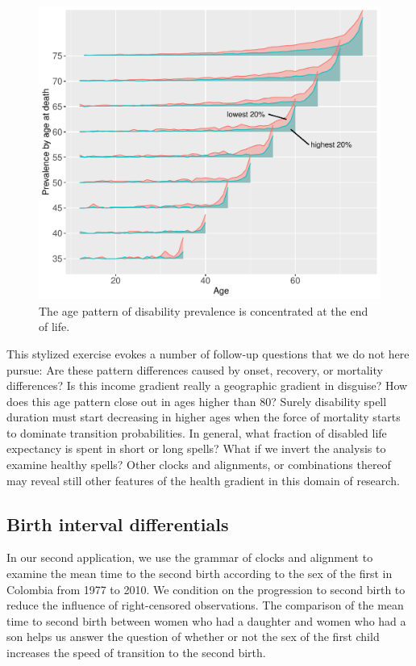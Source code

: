 \documentclass[a4paper,left=1.25cm,right=1.25cm,top=1.25cm,bottom=1.25cm]{article}
\begin{document}
\begin{figure}
    \centering
    \includegraphics[scale=.6]{Figures/App1_macro3.pdf}
    \caption{The age pattern of disability prevalence is concentrated at the end of life. }
    \label{fig:a1m3}
\end{figure}

This stylized exercise evokes a number of follow-up questions that we do not here pursue: Are these pattern differences caused by onset, recovery, or mortality differences? Is this income gradient really a geographic gradient in disguise? How does this age pattern close out in ages higher than 80? Surely disability spell duration must start decreasing in higher ages when the force of mortality starts to dominate transition probabilities. In general, what fraction of disabled life expectancy is spent in short or long spells? What if we invert the analysis to examine healthy spells? Other clocks and alignments, or combinations thereof may reveal still other features of the health gradient in this domain of research.

\FloatBarrier
\subsection{Birth interval differentials}

 In our second application, we use the grammar of clocks and alignment to examine the mean time to the second birth according to the sex of the first in Colombia from 1977 to 2010. We condition on the progression to second birth to reduce the influence of right-censored observations. The comparison of the mean time to second birth between women who had a daughter and women who had a son helps us answer the question of whether or not the sex of the first child increases the speed of transition to the second birth. 
 
\end{document}
